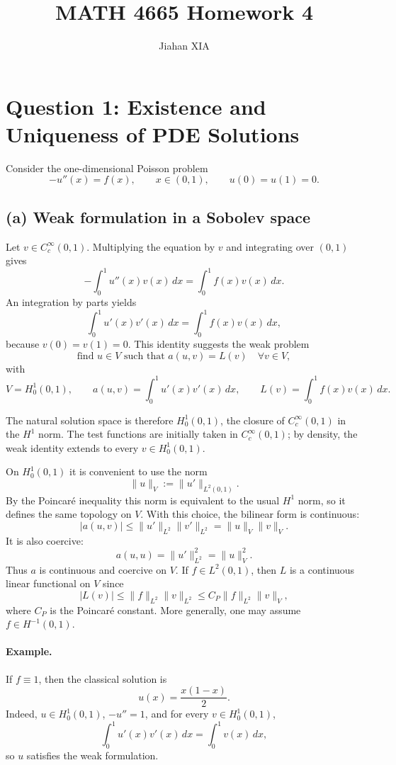 \documentclass[11pt,en]{elegantpaper}
\title{MATH 4665 Homework 4}
\author{Jiahan XIA}
\date{}
\begin{document}
\maketitle

\section*{Question 1: Existence and Uniqueness of PDE Solutions}

Consider the one-dimensional Poisson problem
\[
-u''(x)=f(x), \qquad x\in(0,1), \qquad u(0)=u(1)=0.
\]

\subsection*{(a) Weak formulation in a Sobolev space}

Let \(v\in C_c^\infty(0,1)\). Multiplying the equation by \(v\) and integrating over
\((0,1)\) gives
\[
-\int_0^1 u''(x)v(x)\,dx=\int_0^1 f(x)v(x)\,dx.
\]
An integration by parts yields
\[
\int_0^1 u'(x)v'(x)\,dx=\int_0^1 f(x)v(x)\,dx,
\]
because \(v(0)=v(1)=0\). This identity suggests the weak problem
\[
\text{find } u\in V \text{ such that } a(u,v)=L(v)\quad \forall v\in V,
\]
with
\[
V=H_0^1(0,1), \qquad
a(u,v)=\int_0^1 u'(x)v'(x)\,dx, \qquad
L(v)=\int_0^1 f(x)v(x)\,dx.
\]

The natural solution space is therefore \(H_0^1(0,1)\), the closure of
\(C_c^\infty(0,1)\) in the \(H^1\) norm. The test functions are initially taken in
\(C_c^\infty(0,1)\); by density, the weak identity extends to every
\(v\in H_0^1(0,1)\).

On \(H_0^1(0,1)\) it is convenient to use the norm
\[
\|u\|_V:=\|u'\|_{L^2(0,1)}.
\]
By the Poincar\'e inequality this norm is equivalent to the usual \(H^1\) norm, so it
defines the same topology on \(V\). With this choice, the bilinear form is continuous:
\[
|a(u,v)|\le \|u'\|_{L^2}\|v'\|_{L^2}=\|u\|_V\|v\|_V.
\]
It is also coercive:
\[
a(u,u)=\|u'\|_{L^2}^2=\|u\|_V^2.
\]
Thus \(a\) is continuous and coercive on \(V\). If \(f\in L^2(0,1)\), then \(L\) is a
continuous linear functional on \(V\) since
\[
|L(v)|\le \|f\|_{L^2}\|v\|_{L^2}
\le C_P \|f\|_{L^2}\|v\|_V,
\]
where \(C_P\) is the Poincar\'e constant. More generally, one may assume
\(f\in H^{-1}(0,1)\).

\paragraph{Example.}
If \(f\equiv 1\), then the classical solution is
\[
u(x)=\frac{x(1-x)}{2}.
\]
Indeed, \(u\in H_0^1(0,1)\), \(-u''=1\), and for every \(v\in H_0^1(0,1)\),
\[
\int_0^1 u'(x)v'(x)\,dx=\int_0^1 v(x)\,dx,
\]
so \(u\) satisfies the weak formulation.
\end{document}
